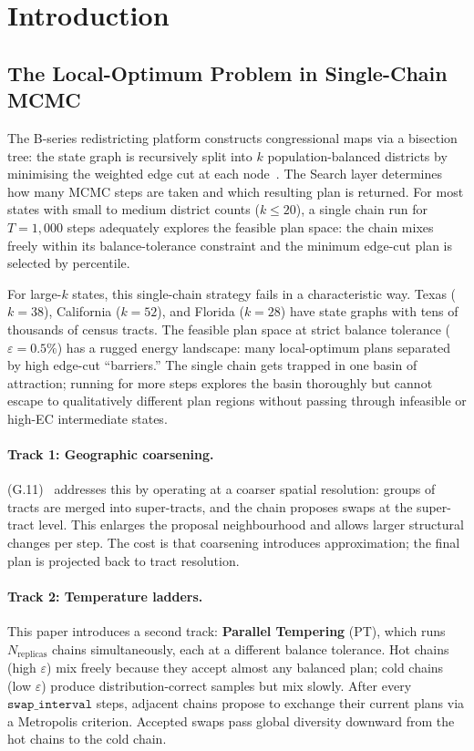 \section{Introduction}
\label{sec:introduction}

\subsection{The Local-Optimum Problem in Single-Chain MCMC}

The B-series redistricting platform constructs congressional maps via a
bisection tree: the state graph is recursively split into $k$ population-balanced
districts by minimising the weighted edge cut at each node~\citep{b8paper}.
The Search layer determines how many MCMC steps are taken and which resulting
plan is returned.
For most states with small to medium district counts ($k \le 20$), a single
\fr{} chain run for $T=1{,}000$ steps adequately explores the feasible plan
space: the chain mixes freely within its balance-tolerance constraint and
the minimum edge-cut plan is selected by percentile.

For large-$k$ states, this single-chain strategy fails in a characteristic way.
Texas ($k=38$), California ($k=52$), and Florida ($k=28$) have state graphs
with tens of thousands of census tracts.
The feasible plan space at strict balance tolerance ($\varepsilon = 0.5\%$) has
a rugged energy landscape: many local-optimum plans separated by high edge-cut
``barriers.''
The single \fr{} chain gets trapped in one basin of attraction; running for
more steps explores the basin thoroughly but cannot escape to qualitatively
different plan regions without passing through infeasible or high-EC intermediate
states.

\paragraph{Track 1: Geographic coarsening.}
\ms{} (G.11)~\citep{dellaLibera2026multiscale} addresses this by operating at
a coarser spatial resolution: groups of tracts are merged into super-tracts,
and the chain proposes swaps at the super-tract level.
This enlarges the proposal neighbourhood and allows larger structural changes
per step.
The cost is that coarsening introduces approximation; the final plan is
projected back to tract resolution.

\paragraph{Track 2: Temperature ladders.}
This paper introduces a second track: \textbf{Parallel Tempering} (PT), which
runs $N_{\mathrm{replicas}}$ chains simultaneously, each at a different balance
tolerance.
Hot chains (high $\varepsilon$) mix freely because they accept almost any
balanced plan; cold chains (low $\varepsilon$) produce distribution-correct
samples but mix slowly.
After every $\mathtt{swap\_interval}$ steps, adjacent chains propose to exchange
their current plans via a Metropolis criterion.
Accepted swaps pass global diversity downward from the hot chains to the cold
chain.

